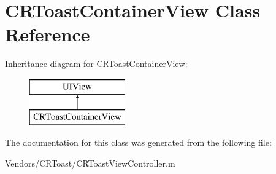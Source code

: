 \hypertarget{interface_c_r_toast_container_view}{}\section{C\+R\+Toast\+Container\+View Class Reference}
\label{interface_c_r_toast_container_view}
Inheritance diagram for C\+R\+Toast\+Container\+View\+:\begin{figure}[H]
\begin{center}
\leavevmode
\includegraphics[height=2.000000cm]{interface_c_r_toast_container_view}
\end{center}
\end{figure}


The documentation for this class was generated from the following file\+:\begin{DoxyCompactItemize}
\item 
Vendors/\+C\+R\+Toast/C\+R\+Toast\+View\+Controller.\+m\end{DoxyCompactItemize}
